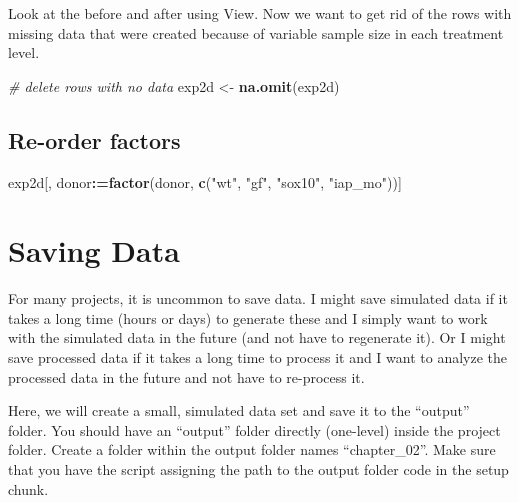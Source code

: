 \documentclass[]{book}
\newenvironment{Shaded}{\begin{snugshade}}{\end{snugshade}}
\newcommand{\KeywordTok}[1]{\textcolor[rgb]{0.13,0.29,0.53}{\textbf{#1}}}
\newcommand{\StringTok}[1]{\textcolor[rgb]{0.31,0.60,0.02}{#1}}
\newcommand{\CommentTok}[1]{\textcolor[rgb]{0.56,0.35,0.01}{\textit{#1}}}
\newcommand{\OperatorTok}[1]{\textcolor[rgb]{0.81,0.36,0.00}{\textbf{#1}}}
\newcommand{\ErrorTok}[1]{\textcolor[rgb]{0.64,0.00,0.00}{\textbf{#1}}}
\newcommand{\NormalTok}[1]{#1}
\begin{document}
Look at the before and after using View. Now we want to get rid of the
rows with missing data that were created because of variable sample size
in each treatment level.

\begin{Shaded}
\begin{Highlighting}[]
\CommentTok{# delete rows with no data}
\NormalTok{exp2d <-}\StringTok{ }\KeywordTok{na.omit}\NormalTok{(exp2d)}
\end{Highlighting}
\end{Shaded}

\subsection{Re-order factors}\label{re-order-factors}

\begin{Shaded}
\begin{Highlighting}[]
\NormalTok{exp2d[, donor}\OperatorTok{:}\ErrorTok{=}\KeywordTok{factor}\NormalTok{(donor, }\KeywordTok{c}\NormalTok{(}\StringTok{"wt"}\NormalTok{, }\StringTok{"gf"}\NormalTok{, }\StringTok{"sox10"}\NormalTok{, }\StringTok{"iap_mo"}\NormalTok{))]}
\end{Highlighting}
\end{Shaded}

\section{Saving Data}\label{saving-data}

For many projects, it is uncommon to save data. I might save simulated
data if it takes a long time (hours or days) to generate these and I
simply want to work with the simulated data in the future (and not have
to regenerate it). Or I might save processed data if it takes a long
time to process it and I want to analyze the processed data in the
future and not have to re-process it.

Here, we will create a small, simulated data set and save it to the
``output'' folder. You should have an ``output'' folder directly
(one-level) inside the project folder. Create a folder within the output
folder names ``chapter\_02''. Make sure that you have the script
assigning the path to the output folder code in the setup chunk.
\end{document}
